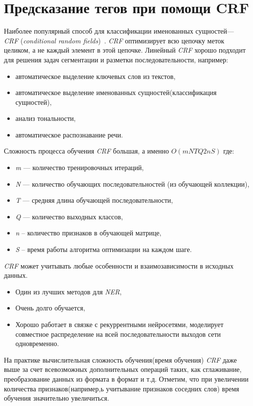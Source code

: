 \documentclass{csmathnotes}
\begin{document}
\section*{Предсказание тегов при помощи CRF}
Наиболее  популярный способ для классификации именованных сущностей— \emph{CRF} (\emph{conditional random fields})~\cite{HabrCRF}. \emph{CRF} оптимизирует всю цепочку меток целиком, а не каждый элемент в этой цепочке.  Линейный \emph{CRF} хорошо подходит для решения задач сегментации и разметки последовательности, например:
\begin{itemize}
	\item автоматическое выделение ключевых слов из текстов,
	\item автоматическое выделение именованных сущностей(классификация сущностей),
	\item анализ тональности,
	\item автоматическое распознавание речи.
\end{itemize}


Сложность процесса обучения \emph{CRF} большая, а именно $O(mNTQ2nS)$ где:
\begin{itemize}
	\item \emph{m} — количество тренировочных итераций,
	\item \emph{N} — количество обучающих последовательностей (из обучающей коллекции),
	\item \emph{T} — средняя длина обучающей последовательности,
	\item \emph{Q} — количество выходных классов,
	\item \emph{n} – количество признаков в обучающей матрице,
	\item \emph{S} – время работы алгоритма оптимизации на каждом шаге. 
\end{itemize}


\emph{CRF} может учитывать любые особенности и взаимозависимости в исходных данных.
\begin{itemize}
	\item Один из лучших методов для \emph{NER},
	\item Очень долго обучается,
	\item Хорошо работает в связке с рекуррентными нейросетями, моделирует совместное распределение на всей последовательности выходов сети одновременно.
\end{itemize}

На практике вычислительная сложность обучения(время обучения) \emph{CRF} даже выше за счет всевозможных дополнительных операций таких, как сглаживание, преобразование данных из формата в формат и т.д. Отметим, что при увеличении количества признаков(например,ь учитывание признаков соседних слов) время обучения значительно увеличиться. 
\end{document}
